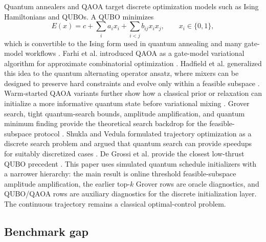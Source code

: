 \documentclass[preprint,12pt]{elsarticle}
\begin{document}
Quantum annealers and QAOA target discrete optimization models such as Ising Hamiltonians and QUBOs. A QUBO minimizes
\begin{equation}
E(x) = c + \sum_i a_i x_i + \sum_{i<j} b_{ij} x_i x_j,\qquad x_i\in\{0,1\},
\end{equation}
which is convertible to the Ising form used in quantum annealing and many gate-model workflows \cite{dwaveQubo,glover2018qubo}. Farhi et al. introduced QAOA as a gate-model variational algorithm for approximate combinatorial optimization \cite{farhi2014qaoa}. Hadfield et al. generalized this idea to the quantum alternating operator ansatz, where mixers can be designed to preserve hard constraints and evolve only within a feasible subspace \cite{hadfield2019alternating}. Warm-started QAOA variants further show how a classical prior or relaxation can initialize a more informative quantum state before variational mixing \cite{egger2021warm}. Grover search, tight quantum-search bounds, amplitude amplification, and quantum minimum finding provide the theoretical search backdrop for the feasible-subspace protocol \cite{grover1996fast,boyer1998tight,brassard2002amplitude,durr1996minimum}. Shukla and Vedula formulated trajectory optimization as a discrete search problem and argued that quantum search can provide speedups for suitably discretized cases \cite{shukla2019trajectory}. De Grossi et al. provide the closest low-thrust QUBO precedent \cite{degrossi2025transcription}. This paper uses simulated quantum schedule initializers with a narrower hierarchy: the main result is online threshold feasible-subspace amplitude amplification, the earlier top-$k$ Grover rows are oracle diagnostics, and QUBO/QAOA rows are auxiliary diagnostics for the discrete initialization layer. The continuous trajectory remains a classical optimal-control problem.

\subsection{Benchmark gap}
\end{document}
